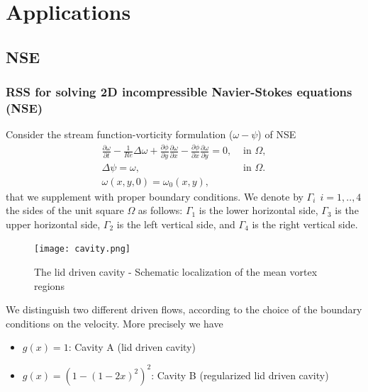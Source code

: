 \documentclass[hyperref={pdfpagemode=FullScreen},9pt]{beamer}
\newcommand{\Frac}[2] {\frac{\textstyle #1} {\textstyle #2}}
\begin{document}
 \section{Applications}
 \subsection{NSE}
 \begin{frame}
 \frametitle{RSS for solving 2D incompressible Navier-Stokes equations (NSE)}
 Consider the stream function-vorticity formulation ($\omega-\psi$) of NSE
 \begin{eqnarray}
\label{Navier_Stokes_psi}
\Frac{\partial \omega}{\partial t}-\Frac {1}{Re}\Delta \omega
 +\Frac {\partial \phi}{\partial y}
\Frac {\partial \omega}{\partial x} - \Frac {\partial \phi}{\partial
x}
\Frac {\partial \omega}{\partial y}=0, & \mbox{ in }  \Omega,\\
\Delta \psi =\omega, & \mbox{ in }   \Omega. \\
\omega(x,y,0)=\omega_0(x,y),
\end{eqnarray}
that we supplement with proper boundary conditions. We denote by ${\Gamma}_{i} \
\ i=1,..,4$ the sides of the unit square $\Omega$ as follows:
${\Gamma}_{1}$ is the lower horizontal side, ${\Gamma}_{3}$ is the
upper horizontal side, ${\Gamma}_{2}$ is the left vertical side, and
${\Gamma}_{4}$ is the right vertical side.
 \end{frame}
 \begin{frame}
 \begin{figure}[h]
\begin{center}
\texttt{[image: cavity.png]}
\end{center}
\caption{The lid driven cavity - Schematic localization of the mean
vortex regions}
\end{figure}

We distinguish two different driven flows, according to the choice of
the boundary conditions on the velocity. More precisely we have
\begin{itemize}
\item $g(x)=1$: Cavity A (lid driven cavity)
\item $g(x)=(1-(1-2x)^2)^2$: Cavity B (regularized lid driven cavity)
\end{itemize}
 \end{frame}
\end{document}
